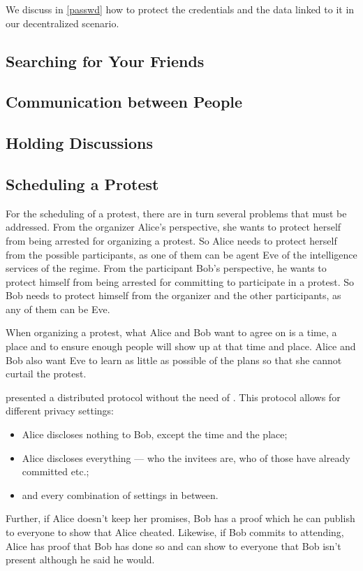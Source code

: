 We discuss in \cref{passwd} how to protect the credentials and the data linked to 
it in our decentralized scenario.

\subsection{Searching for Your Friends}
\label{UserSearch}





\subsection{Communication between People}
\label{Communicating}



\subsection{Holding Discussions}
\label{Discussions}



\subsection{Scheduling a Protest}
\label{Scheduling}

For the scheduling of a protest, there are in turn several problems that must 
be addressed.
From the organizer Alice's perspective, she wants to protect herself from being 
arrested for organizing a protest.
So Alice needs to protect herself from the possible participants, as one of 
them can be agent Eve of the intelligence services of the regime.
From the participant Bob's perspective, he wants to protect himself from being 
arrested for committing to participate in a protest.
So Bob needs to protect himself from the organizer and the other participants, 
as any of them can be Eve.

When organizing a protest, what Alice and Bob want to agree on is a time, 
a place and to ensure enough people will show up at that time and place.
Alice and Bob also want Eve to learn as little as possible of the plans so 
that she cannot curtail the protest.

\citet{EventsInvitations} presented a distributed protocol without the need of 
.
This protocol allows for different privacy settings:
\begin{itemize}
\item Alice discloses nothing to Bob, except the time and the place;
\item Alice discloses everything --- who the invitees are, who of those have 
  already committed etc.;
\item and every combination of settings in between.
\end{itemize}
Further, if Alice doesn't keep her promises, Bob has a proof which he can 
publish to everyone to show that Alice cheated.
Likewise, if Bob commits to attending, Alice has proof that Bob has done so and 
can show to everyone that Bob isn't present although he said he would.

